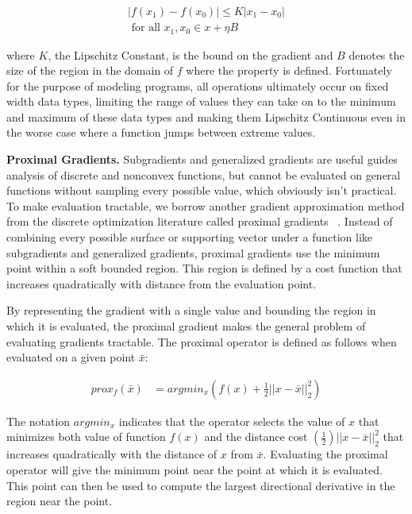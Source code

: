\vspace{-10pt}\begin{align}
  |f\left(x_1\right) - f\left(x_0\right)| \leq K|x_1 - x_0|\\
  \textrm{ for all } x_1, x_0 \in x+\eta B \nonumber
\end{align}

\noindent where $K$, the Lipschitz Constant, is the bound on the gradient and $B$ denotes the size of the region in the domain of $f$ where the property is defined. Fortunately for the purpose of modeling programs, all operations ultimately occur on fixed width data types, limiting the range of values they can take on to the minimum and maximum of these data types and making them Lipschitz Continuous even in the worse case where a function jumps between extreme values.


\noindent \textbf{Proximal Gradients.} Subgradients and generalized gradients are useful guides analysis of discrete and nonconvex functions, but cannot be evaluated on general functions without sampling every possible value, which obviously isn't practical. To make evaluation tractable, we borrow another gradient approximation method from the discrete optimization literature called proximal gradients ~\cite{parikh2014proximal}. Instead of combining every possible surface or supporting vector under a function like subgradients and generalized gradients, proximal gradients use the minimum point within a soft bounded region. This region is defined by a cost function that increases quadratically with distance from the evaluation point. 

By representing the gradient with a single value and bounding the region in which it is evaluated, the proximal gradient makes the general problem of evaluating gradients tractable. The proximal operator is defined as follows when evaluated on a given point $\bar{x}$:

\vspace{-10pt}\begin{align}
  prox_f\left(\bar{x}\right) &= argmin_x \left(f\left(x\right) + \tfrac{1}{2}|| x-\bar{x}||_2^2\right)
\end{align}

The notation $argmin_x$ indicates that the operator selects the value of $x$ that minimizes both value of function $f\left(x\right)$ and the distance cost $\left(\tfrac{1}{2}\right)|| x-\bar{x}||_2^2$ that increases quadratically with the distance of $x$ from $\bar{x}$. Evaluating the proximal operator will give the minimum point near the point at which it is evaluated. This point can then be used to compute the largest directional derivative in the region near the point. 

